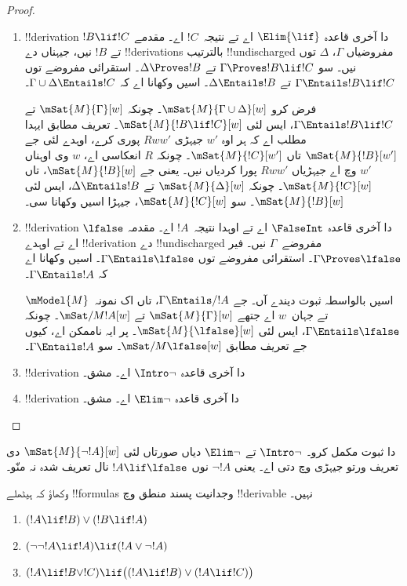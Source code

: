 \documentclass[../../../include/open-logic-section]{subfiles}
\begin{document}
\begin{proof}
\begin{enumerate}
  \item !!{derivation} دا آخری قاعدہ $\Elim{\lif}$ اے تے نتیجہ~$!C$ اے۔
    مقدمے $!B \lif !C$ تے $!B$ نیں، جیہناں دے !!{derivation}s بالترتیب
    !!{undischarged} مفروضیاں $\Gamma$، $\Delta$ توں نیں۔ سو
    $\Gamma \Proves !B \lif !C$ تے $\Delta \Proves !B$۔ استقرائی مفروضے توں
    $\Gamma \Entails !B \lif !C$ تے $\Delta \Entails !B$۔
    اسیں وکھانا اے کہ $\Gamma \cup \Delta \Entails !C$۔

    فرض کرو $\mSat{M}{\Gamma \cup \Delta}[w]$۔ چونکہ
    $\mSat{M}{\Gamma}[w]$ تے $\Gamma \Entails !B \lif !C$، ایس لئی
    $\mSat{M}{!B \lif !C}[w]$۔ تعریف مطابق ایہدا مطلب اے کہ ہر اوہ
    $w'$ جیہڑی $Rww'$ پوری کرے، اوہدے لئی جے $\mSat{M}{!B}[w']$ تاں
    $\mSat{M}{!C}[w']$۔ چونکہ $R$ انعکاسی اے، $w$ وی اوہناں $w'$
    وچ اے جیہڑیاں $Rww'$ پورا کردیاں نیں۔ یعنی جے $\mSat{M}{!B}[w]$، تاں
    $\mSat{M}{!C}[w]$۔ چونکہ $\mSat{M}{\Delta}[w]$ تے $\Delta
    \Entails !B$، ایس لئی $\mSat{M}{!B}[w]$۔ سو $\mSat{M}{!C}[w]$،
    جیہڑا اسیں وکھانا سی۔

  \item !!{derivation} دا آخری قاعدہ $\FalseInt$ اے تے اوہدا نتیجہ~$!A$ اے۔
    مقدمہ $\lfalse$ اے تے اوہدے !!{derivation} دے !!{undischarged} مفروضے~$\Gamma$
    نیں۔ فیر $\Gamma \Proves \lfalse$۔ استقرائی مفروضے توں
    $\Gamma \Entails \lfalse$۔ اسیں وکھانا اے کہ $\Gamma \Entails !A$۔

    اسیں بالواسطہ ثبوت دیندے آں۔ جے $\Gamma \Entails/ !A$، تاں اک نمونہ~$\mModel{M}$
    تے جہان~$w$ اے جتھے $\mSat{M}{\Gamma}[w]$ تے $\mSat/{M}{!A}[w]$۔
    چونکہ $\Gamma \Entails \lfalse$، ایس لئی $\mSat{M}{\lfalse}[w]$۔
    پر ایہ ناممکن اے، کیوں جے تعریف مطابق $\mSat/{M}{\lfalse}[w]$۔
    سو $\Gamma \Entails !A$۔
  \item !!{derivation} دا آخری قاعدہ $\Intro\lnot$ اے۔ مشق۔
  \item !!{derivation} دا آخری قاعدہ $\Elim\lnot$ اے۔ مشق۔
  \end{enumerate}
\end{proof}

\begin{prob}
   دا ثبوت مکمل کرو۔ $\Intro\lnot$ تے
  $\Elim\lnot$ دیاں صورتاں لئی $\mSat{M}{\lnot !A}[w]$ دی تعریف ورتو
  جیہڑی  وچ دتی اے۔ یعنی $\lnot !A$
  نوں $!A \lif \lfalse$ نال تعریف شدہ نہ منّو۔
\end{prob}

\begin{prob}
  وکھاؤ کہ ہیٹھلے !!{formula}s وجدانیت پسند منطق وچ !!{derivable} نہیں۔
  \begin{enumerate}
    \item $(!A \lif !B) \lor (!B \lif !A)$
    \item $(\lnot\lnot !A \lif !A) \lif (!A \lor \lnot !A)$
    \item $(!A \lif !B \lor !C) \lif \bigl((!A \lif !B)\lor(!A \lif !C)\bigr)$
  \end{enumerate}
\end{prob}
\end{document}
